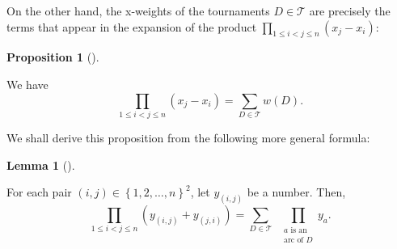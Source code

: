 \documentclass[numbers=enddot,12pt,final,onecolumn,notitlepage]{scrartcl}%
\numberwithin{exer}{subsection}
\theoremstyle{definition}
\newtheorem{lem}[theo]{Lemma}
\newenvironment{lemma}[1][]
{\begin{lem}[#1]\begin{leftbar}}
{\end{leftbar}\end{lem}}
\newtheorem{prop}[theo]{Proposition}
\newenvironment{proposition}[1][]
{\begin{prop}[#1]\begin{leftbar}}
{\end{leftbar}\end{prop}}
\let\sumnonlimits\sum
\let\prodnonlimits\prod
\renewcommand{\sum}{\sumnonlimits\limits}
\renewcommand{\prod}{\prodnonlimits\limits}
\begin{document}
On the other hand, the x-weights of the tournaments $D\in\mathcal{T}$ are
precisely the terms that appear in the expansion of the product $\prod_{1\leq
i<j\leq n}\left(  x_{j}-x_{i}\right)  $:

\begin{proposition}
\label{prop.tour1n.prodxjxi}We have%
\[
\prod_{1\leq i<j\leq n}\left(  x_{j}-x_{i}\right)  =\sum_{D\in\mathcal{T}%
}w\left(  D\right)  .
\]

\end{proposition}

We shall derive this proposition from the following more general formula:

\begin{lemma}
\label{lem.tour1n.prody}For each pair $\left(  i,j\right)  \in\left\{
1,2,\ldots,n\right\}  ^{2}$, let $y_{\left(  i,j\right)  }$ be a number. Then,%
\[
\prod_{1\leq i<j\leq n}\left(  y_{\left(  i,j\right)  }+y_{\left(  j,i\right)
}\right)  =\sum_{D\in\mathcal{T}}\ \ \prod_{\substack{a\text{ is
an}\\\text{arc of }D}}y_{a}.
\]

\end{lemma}
\end{document}
